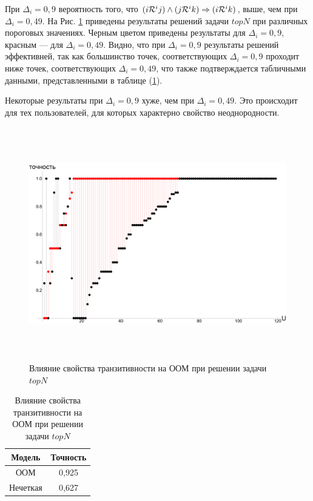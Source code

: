 При $\Delta_i = 0,9$ вероятность того, что $(i \mathcal{R}^i j) \wedge (j \mathcal{R}^i k)
\Rightarrow (i \mathcal{R}^i k)$, выше, чем при $\Delta_i = 0,49$.
На Рис. \ref{pic:topn_trans} приведены результаты решений задачи $topN$ при
различных пороговых значениях. Черным цветом приведены результаты для
$\Delta_i = 0,9$, красным --- для $\Delta_i = 0,49$.
Видно, что при $\Delta_i = 0,9$ результаты решений эффективней, так
как большинство точек, соответствующих $\Delta_i = 0,9$ проходит ниже точек,
соответствующих $\Delta_i = 0,49$, что также подтверждается табличными данными,
представленными в таблице (\ref{tbl:topn_trans}).

Некоторые результаты при $\Delta_i = 0,9$ хуже, чем при
$\Delta_i = 0,49$. Это происходит для тех пользователей,
для которых характерно свойство неоднородности.

\begin{figure}[H]
	\caption{Влияние свойства транзитивности на ООМ при решении задачи $topN$}
	\label{pic:topn_trans}
	\begin{center}
		\includegraphics[width=7in,height=4in]{pics/results/transitivity.pdf}
\end{center}
\end{figure}

\begin{table}[H]
	\caption{Влияние свойства транзитивности на ООМ при решении задачи $topN$}
  \label{tbl:topn_trans}
  \begin{center}
	\begin{tabular}{|c|c|}
	  \hline
		Модель& Точность \\ \hline
		ООМ&0,925 \\ \hline
		Нечеткая&0,627 \\ \hline
	\end{tabular}
  \end{center}
\end{table}

